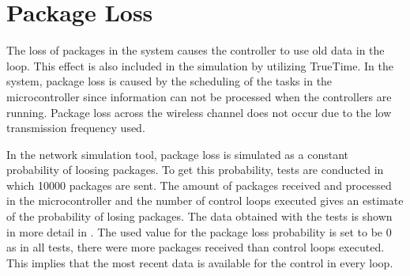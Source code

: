 \section{Package Loss}
The loss of packages in the system causes the controller to use old data in the loop. This effect is also included in the simulation by utilizing TrueTime. In the system, package loss is caused by the scheduling of the tasks in the microcontroller since information can not be processed when the controllers are running. Package loss across the wireless channel does not occur due to the low transmission frequency used. 

In the network simulation tool, package loss is simulated as a constant probability of loosing packages. To get this probability, tests are conducted in which 10000 packages are sent. The amount of packages received and processed in the microcontroller and the number of control loops executed gives an estimate of the probability of losing packages. The data obtained with the tests is shown in more detail in . The used value for the package loss probability is set to be 0 as in all tests, there were more packages received than control loops executed. This implies that the most recent data is available for the control in every loop. 
